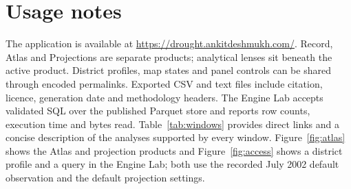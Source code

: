 \documentclass[10pt,a4paper]{article}
\begin{document}
\section*{Usage notes}
The application is available at \url{https://drought.ankitdeshmukh.com/}. Record, Atlas and Projections are separate products; analytical lenses sit beneath the active product. District profiles, map states and panel controls can be shared through encoded permalinks. Exported CSV and text files include citation, licence, generation date and methodology headers. The Engine Lab accepts validated SQL over the published Parquet store and reports row counts, execution time and bytes read. Table~\ref{tab:windows} provides direct links and a concise description of the analyses supported by every window. Figure~\ref{fig:atlas} shows the Atlas and projection products and Figure~\ref{fig:access} shows a district profile and a query in the Engine Lab; both use the recorded July 2002 default observation and the default projection settings.
\end{document}
